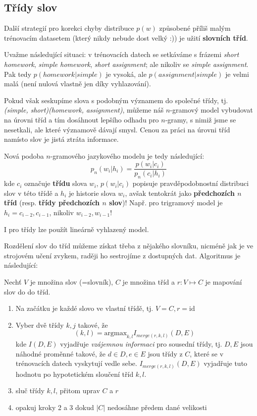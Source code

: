 \documentclass[11pt]{report} %
\numberwithin{equation}{section}
\begin{document}
\subsection{Třídy slov}
Další strategií pro korekci chyby distribuce $p(w)$ způsobené příliš malým trénovacím datasetem (který nikdy nebude dost velký :)) je užití \textbf{slovních tříd}. 

Uvažme následující situaci: v trénovacích datech se setkáváme s frázemi \textit{short homework}, \textit{simple homework}, \textit{short assignment}; ale nikoliv se \textit{simple assignment}. Pak tedy $p(homework|simple)$ je vysoká, ale $p(assignment|simple)$ je velmi malá (není nulová vlastně jen díky vyhlazování). 

Pokud však seskupíme slova s podobným významem do společné třídy, tj. \textit{(simple, short)(homework, assignment)}, můžeme náš $n$-gramový model vybudovat na úrovni tříd a tím dosáhnout lepšího odhadu pro $n$-gramy, s nimiž jsme se nesetkali, ale které významově dávají smysl. Cenou za práci na úrovni tříd namísto slov je jistá ztráta informace.

Nová podoba $n$-gramového jazykového modelu je tedy následující:
$$p_n(w_i|h_i) = \frac{p(w_i|c_i)}{p_n(c_i|h_i)}$$
kde $c_i$ označuje \textbf{třídu} slova $w_i$, $p(w_i|c_i)$ popisuje pravděpodobnostní distribuci slov v této třídě a $h_i$ je historie slova $w_i$, avšak tentokrát jako \textbf{předchozích $n$ tříd} (resp. \textbf{třídy předchozích $n$ slov})! Např. pro trigramový model je $h_i = c_{i-2},c_{i-1}$, nikoliv $w_{i-2},w_{i-1}$!

I pro třídy lze použít lineárně vyhlazený model.

Rozdělení slov do tříd můžeme získat třeba z nějakého slovníku, nicméně jak je ve strojovém učení zvykem, raději ho sestrojíme z dostupných dat. Algoritmus je následující:

Nechť $V$ je množina slov (=slovník), $C$ je množina tříd a $r : V \mapsto C$ je mapování slov do do tříd.
\begin{enumerate}
	
	
	\item Na začátku je každé slovo ve vlastní třídě, tj. $V = C, r = \text{id}$
	\item Vyber dvě třídy $k,j$ takové, že
	$$(k,l) = \text{argmax}_{k,l} I_{merge(r,k,l)}(D,E)$$
	kde $I(D,E)$ vyjadřuje \textit{vzájemnou informaci} pro sousední třídy, tj. $D,E$ jsou náhodné proměnné takové, že $d \in D, e \in E$ jsou třídy z $C$, které se v trénovacích datech vyskytují vedle sebe. $I_{merge(r,k,l)}(D,E)$ vyjadřuje tuto hodnotu po hypotetickém sloučení tříd $k,l$.
	\item sluč třídy $k,l$, přitom uprav $C$ a $r$
	\item opakuj kroky 2 a 3 dokud $|C|$ nedosáhne předem dané velikosti
\end{enumerate}
\end{document}
